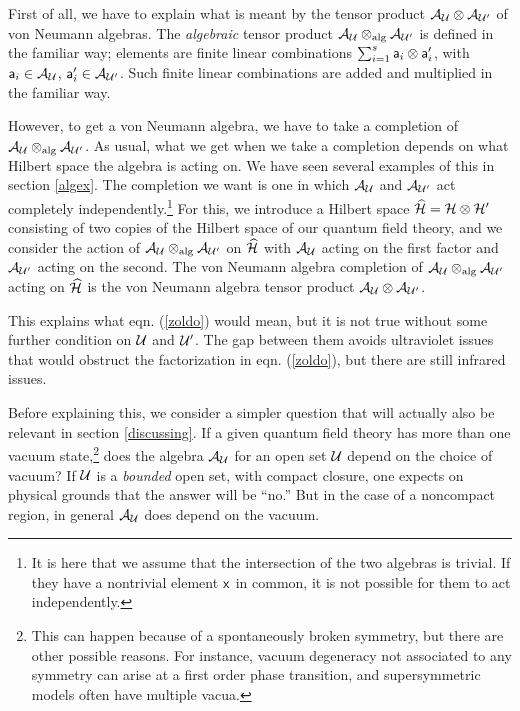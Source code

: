 \documentclass[12pt]{article}
\def\x{{\sf x}}
\def\a{{\sf a}}
\def\h{\widehat}
\numberwithin{equation}{section}
\def\A{{\mathcal A}}
\begin{document}
First of all, we have to explain what is meant by the tensor product $\A_\U\otimes \A_{\U'}$ of von Neumann algebras.
The {\it algebraic} tensor product $\A_\U\otimes_\alg \A_{\U'}$ is defined in the familiar way; elements are finite linear combinations
$\sum_{i=1}^s \a_i\otimes \a'_i$, with $\a_i\in \A_\U$, $\a'_i\in \A_{\U'}$.  Such finite linear combinations are added and multiplied
in the familiar way.

However, to get a von Neumann algebra, we have to take a completion of $\A_\U\otimes_\alg \A_{\U'}$.  As usual, what we get
when we take a completion depends on what Hilbert space the algebra is acting on.  We have seen several examples of this in section
\ref{algex}.  The completion we want is one in which $\A_\U$ and $\A_{\U'}$ act completely independently.\footnote{It is here
that we assume that the intersection of the two algebras is trivial.  If they have a nontrivial element $\x$ in common,
it is not possible for them to act independently.}
 For this, we introduce
a Hilbert space $\h\H=\H\otimes \H'$ consisting of two copies of the Hilbert space of our quantum field theory, and we consider
the action of $\A_\U\otimes_\alg \A_{\U'}$ on $\h\H$ with $\A_\U$ acting on the first factor and $\A_{\U'}$ acting on the second. 
The von Neumann algebra completion of $\A_\U\otimes_\alg \A_{\U'}$ acting on $\h\H$ is the von Neumann algebra tensor
product $\A_\U\otimes \A_{\U'}$.

This explains what eqn. (\ref{zoldo}) would mean, but it is not true without some further condition on ${\mathcal U}$ and ${\mathcal U}'$.   The gap
between them avoids ultraviolet issues that would obstruct the factorization in eqn. (\ref{zoldo}), but there are still infrared issues.

 Before
explaining this, we consider a simpler question that will actually also be relevant in section \ref{discussing}.
If a given quantum field theory has more than one vacuum state,\footnote{This can happen because of a spontaneously broken
symmetry, but there are other possible reasons.  For instance, vacuum degeneracy not associated to any symmetry can arise
at a first order phase transition, and supersymmetric models often have multiple vacua.}   does the algebra 
$\A_\U$ for an open set ${\mathcal U}$ depend on the choice of vacuum?   If ${\mathcal U}$ is a {\it bounded} open set, with compact closure, 
one expects on physical grounds that the answer will be ``no.'' But in the case of a noncompact region, in general $\A_\U$ does depend on
the vacuum.
\end{document}

